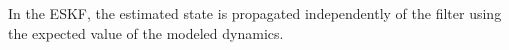 In the ESKF, the estimated state is propagated independently of the filter using
the expected value of the modeled dynamics.

